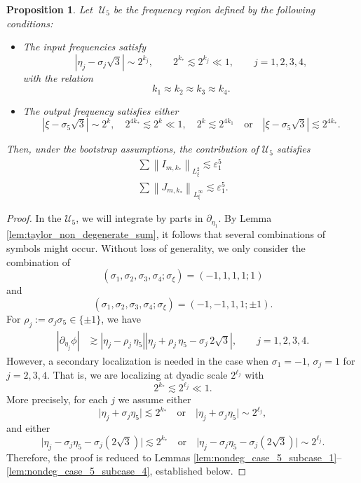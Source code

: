 \documentclass[reqno,english,11pt]{amsart}
\newcommand{\eps}{\varepsilon}
\newcommand{\snorm}[1]{\left\|#1\right\|}
\newtheorem{proposition}[theorem]{Proposition}
\theoremstyle{definition}
\numberwithin{equation}{section}
\begin{document}
\begin{proposition}\label{prop:non_deg_case_5}
Let $\;\mathcal{U}_5$ be the frequency region defined by the following conditions:
\begin{itemize}
    \item The input frequencies satisfy
    $$ |\eta_j-\sigma_j\sqrt{3}| \sim 2^{k_j}, \qquad 2^{k_*} \lesssim 2^{k_j} \ll 1, \qquad j=1,2,3,4,$$
    with the relation
    $$  k_1 \approx k_2 \approx k_3 \approx k_4.$$
    \item The output frequency satisfies either
    $$  |\xi-\sigma_5\sqrt{3}| \sim 2^{k},\quad 2^{4k_{*}}\lesssim 2^{k} \ll 1, \quad 2^{k} \lesssim 2^{4k_1}  \quad \text{or} \quad |\xi-\sigma_5\sqrt{3}| \lesssim 2^{4k_{*}}.$$
\end{itemize}
Then, under the bootstrap assumptions, the contribution of $\mathcal{U}_5$ satisfies
    \begin{align}
        \sum\snorm{I_{m,k_*}}_{L^2_\xi}\lesssim \eps_1^5\label{eq:goal_nondeg_case_5_I}\\
        \sum\snorm{J_{m,k_*}}_{L^\infty_\xi}\lesssim \eps_1^5.\label{eq:goal_nondeg_case_5_J}
    \end{align}
\end{proposition}
\begin{proof}
    In the $\mathcal{U}_5$, we will integrate by parts in $\partial_{\eta_1}$. By Lemma \ref{lem:taylor_non_degenerate_sum}, it follows that several combinations of symbols might occur. Without loss of generality, we only consider the combination of 
    $$(\sigma_1, \sigma_2,\sigma_3,\sigma_4;\sigma_\xi)=(-1,1,1,1;1)$$
    and
    $$(\sigma_1, \sigma_2,\sigma_3,\sigma_4;\sigma_\xi)=(-1,-1,1,1;\pm1).$$
    For $\rho_j:=\sigma_j\sigma_5\in \{\pm 1\}$, we have
    \begin{align*}
        |\partial_{\eta_j} \phi|&\gtrsim |\eta_j-\rho_j\,\eta_5|\left|\eta_j+\rho_j\,\eta_5-\sigma_j\,2\sqrt{3}\right|,\qquad j=1,2,3,4.
    \end{align*}
    However, a secondary localization is needed in the case when $\sigma_1=-1$, $\sigma_j=1$ for $j=2,3,4$. That is, we are localizing at dyadic scale $2^{\ell_j}$ with
    $$2^{k_*}\lesssim 2^{\ell_j}\ll 1.$$
    More precisely, for each $j$ we assume either
    $$\big|\eta_j+\sigma_j\eta_5\big| \lesssim 2^{k_*}\quad \text{or}\quad \big|\eta_j+\sigma_j\eta_5\big|\sim 2^{\ell_j},$$
    and either
    $$\big|\eta_j-\sigma_j\eta_5-\sigma_j(2\sqrt3)\big|\lesssim 2^{k_*}\quad \text{or}\quad \big|\eta_j-\sigma_j\eta_5-\sigma_j(2\sqrt3)\big|\sim 2^{\ell_j}.$$
    Therefore, the proof is reduced to Lemmas 
\ref{lem:nondeg_case_5_subcase_1}--\ref{lem:nondeg_case_5_subcase_4},  established below.
\end{proof}
\end{document}

